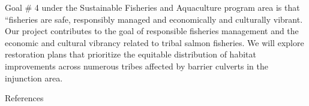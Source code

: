 \documentclass[12pt]{elsarticle}
\begin{document}
Goal \# 4 under the Sustainable Fisheries and Aquaculture program area is that ``fisheries are safe, responsibly managed and economically and culturally vibrant. Our project contributes to the goal of responsible fisheries management and the economic and cultural vibrancy related to tribal salmon fisheries. We will explore restoration plans that prioritize the equitable distribution of habitat improvements across numerous tribes affected by barrier culverts in the injunction area. 





\clearpage
\large References\\
\normalsize

\end{document}
